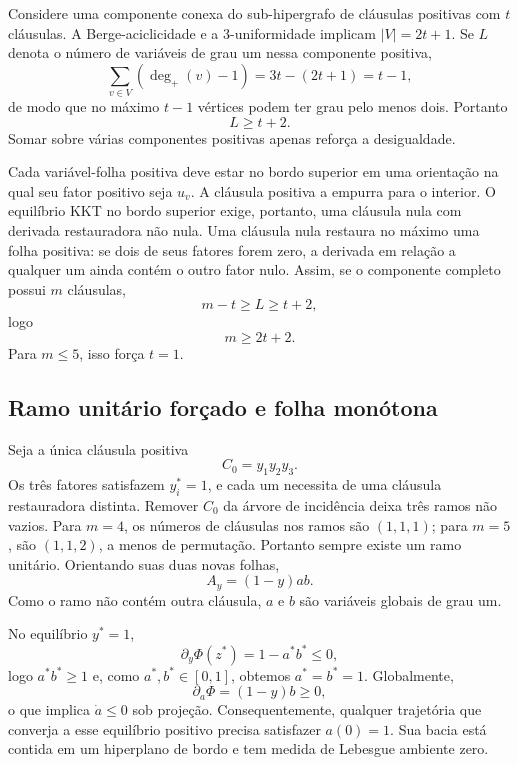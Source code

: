 \documentclass[11pt,a4paper]{article}
\begin{document}
Considere uma componente conexa do sub-hipergrafo de cláusulas positivas com $t$ cláusulas. A Berge-aciclicidade e a 3-uniformidade implicam $|V|=2t+1$. Se $L$ denota o número de variáveis de grau um nessa componente positiva,
\[
\sum_{v\in V}(\deg_+(v)-1)=3t-(2t+1)=t-1,
\]
de modo que no máximo $t-1$ vértices podem ter grau pelo menos dois. Portanto
\begin{equation}
L\ge t+2.
\end{equation}
Somar sobre várias componentes positivas apenas reforça a desigualdade.

Cada variável-folha positiva deve estar no bordo superior em uma orientação na qual seu fator positivo seja $u_v$. A cláusula positiva a empurra para o interior. O equilíbrio KKT no bordo superior exige, portanto, uma cláusula nula com derivada restauradora não nula. Uma cláusula nula restaura no máximo uma folha positiva: se dois de seus fatores forem zero, a derivada em relação a qualquer um ainda contém o outro fator nulo. Assim, se o componente completo possui $m$ cláusulas,
\begin{equation}
m-t\ge L\ge t+2,
\end{equation}
logo
\begin{equation}
m\ge 2t+2.
\end{equation}
Para $m\le5$, isso força $t=1$.

\subsection{Ramo unitário forçado e folha monótona}
Seja a única cláusula positiva
\[
C_0=y_1y_2y_3.
\]
Os três fatores satisfazem $y_i^*=1$, e cada um necessita de uma cláusula restauradora distinta. Remover $C_0$ da árvore de incidência deixa três ramos não vazios. Para $m=4$, os números de cláusulas nos ramos são $(1,1,1)$; para $m=5$, são $(1,1,2)$, a menos de permutação. Portanto sempre existe um ramo unitário. Orientando suas duas novas folhas,
\begin{equation}
A_y=(1-y)ab.
\end{equation}
Como o ramo não contém outra cláusula, $a$ e $b$ são variáveis globais de grau um.

No equilíbrio $y^*=1$,
\[
\partial_y\Phi(z^*)=1-a^*b^*\le0,
\]
logo $a^*b^*\ge1$ e, como $a^*,b^*\in[0,1]$, obtemos $a^*=b^*=1$. Globalmente,
\begin{equation}
\partial_a\Phi=(1-y)b\ge0,
\end{equation}
o que implica $\dot a\le0$ sob projeção. Consequentemente, qualquer trajetória que converja a esse equilíbrio positivo precisa satisfazer $a(0)=1$. Sua bacia está contida em um hiperplano de bordo e tem medida de Lebesgue ambiente zero.
\end{document}
